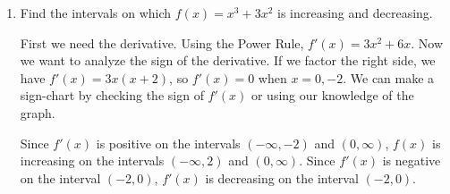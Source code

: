 \documentclass{article}
\begin{document}
\begin{enumerate}
\begin{enumerate}
    \begin{solution}
        If $x=0$, then $y=0$, so the only $y$-intercept is $(0,0)$. 

        If $y=0$, then we have
        \begin{align*}
            0&= x^3+3x^2 \\
            &= x^2(x+3) \\
            x&=0, -3
        \end{align*}
        So the $x$-intercepts are $(0,0)$ and $(-3,0)$.
    \end{solution}
    

    \item 
    \begin{problem}
        Find the intervals on which $f(x)=x^3+3x^2$ is increasing and decreasing.
    \end{problem}

    \begin{solution}
        First we need the derivative. Using the Power Rule, $f'(x)=3x^2+6x$. Now we want to analyze the sign of the derivative. If we factor the right side, we have $f'(x)=3x(x+2)$, so $f'(x)=0$ when $x=0,-2$. We can make a sign-chart by checking the sign of $f'(x)$ or using our knowledge of the graph.

        \begin{center}
        \end{center}
        Since $f'(x)$ is positive on the intervals $(-\infty, -2)$ and $(0, \infty)$, $f(x)$ is increasing on the intervals $(-\infty, 2)$ and $(0,\infty)$. Since $f'(x)$ is negative on the interval $(-2,0)$, $f'(x)$ is decreasing on the interval $(-2,0)$.
    \end{solution}


\end{enumerate}
\end{enumerate}
\end{document}
